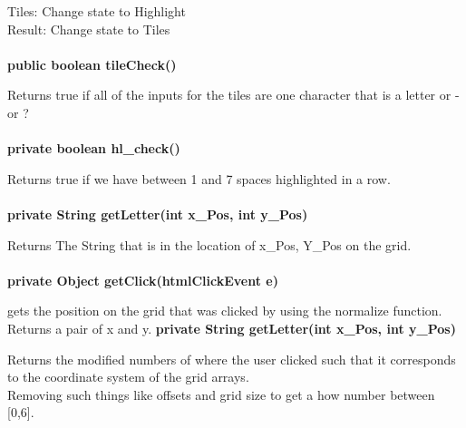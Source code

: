 \documentclass[11pt]{article}
\begin{document}
Tiles: Change state to Highlight\\

Result: Change state to Tiles\\\\
%
\textbf{public boolean tileCheck()\\}

Returns true if all of the inputs for the tiles are one character that is a letter or - or ?\\\\
%
\textbf{private boolean hl\_check()\\}

Returns true if we have between 1 and 7 spaces highlighted in a row.\\\\
%
\textbf{private String getLetter(int x\_Pos, int y\_Pos)\\}

Returns The String that is in the location of x\_Pos, Y\_Pos on the grid.\\\\
%
\textbf{private Object getClick(htmlClickEvent e)}

gets the position on the grid that was clicked by using the normalize function.\\ Returns a pair of x and y.
%
\textbf{private String getLetter(int x\_Pos, int y\_Pos)\\}

Returns the modified numbers of where the user clicked such that it corresponds to the coordinate system of the grid arrays.\\
Removing such things like offsets and grid size to get a how number between [0,6].
\end{document}
